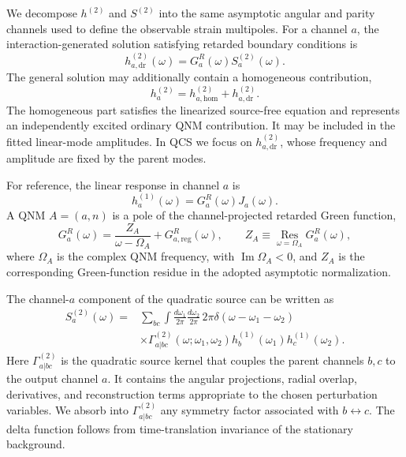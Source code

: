 \documentclass[
 reprint,
 amsmath,amssymb,
 aps,
 prl,
 superscriptaddress,
 nofootinbib
]{revtex4-2}
\begin{document}
We decompose \(h^{(2)}\) and \(S^{(2)}\) into the same asymptotic angular and parity channels used to define the observable strain multipoles. For a channel \(a\), the interaction-generated solution satisfying retarded boundary conditions is
\begin{equation}
	h_{a,\mathrm{dr}}^{(2)}(\omega)
	=
	G_a^R(\omega)S_a^{(2)}(\omega).
	\label{eq:retarded-second-order-solution}
\end{equation}
The general solution may additionally contain a homogeneous contribution,
\begin{equation}
	h_a^{(2)}
	=
	h_{a,\mathrm{hom}}^{(2)}
	+h_{a,\mathrm{dr}}^{(2)}.
\end{equation}
The homogeneous part satisfies the linearized source-free equation and represents an independently excited ordinary QNM contribution. It may be included in the fitted linear-mode amplitudes. In QCS we focus on \(h_{a,\mathrm{dr}}^{(2)}\), whose frequency and amplitude are fixed by the parent modes.

For reference, the linear response in channel \(a\) is
\begin{equation}
	h_a^{(1)}(\omega)
	=
	G_a^R(\omega)J_a(\omega).
\end{equation}
A QNM \(A=(a,n)\) is a pole of the channel-projected retarded Green function,
\begin{equation}
	G_a^R(\omega)
	=
	\frac{Z_A}{\omega-\Omega_A}
	+G_{a,\mathrm{reg}}^R(\omega),
	\qquad
	Z_A
	\equiv
	\underset{\omega=\Omega_A}{\operatorname{Res}}
	G_a^R(\omega),
	\label{eq:linear-qnm-pole}
\end{equation}
where \(\Omega_A\) is the complex QNM frequency, with
\(\operatorname{Im}\Omega_A<0\), and \(Z_A\) is the corresponding Green-function residue in the adopted asymptotic normalization.

The channel-\(a\) component of the quadratic source can be written as
\begin{align}
	S_a^{(2)}(\omega)
	={}&
	\sum_{bc}
	\int\frac{d\omega_1}{2\pi}
	\frac{d\omega_2}{2\pi}\,
	2\pi\delta(\omega-\omega_1-\omega_2)
	\nonumber\\
	&\times
	\Gamma^{(2)}_{a|bc}(\omega;\omega_1,\omega_2)
	h_b^{(1)}(\omega_1)h_c^{(1)}(\omega_2).
	\label{eq:quadratic-source-kernel}
\end{align}
Here \(\Gamma^{(2)}_{a|bc}\) is the quadratic source kernel that couples the parent channels \(b,c\) to the output channel \(a\). It contains the angular projections, radial overlap, derivatives, and reconstruction terms appropriate to the chosen perturbation variables. We absorb into \(\Gamma^{(2)}_{a|bc}\) any symmetry factor associated with \(b\leftrightarrow c\). The delta function follows from time-translation invariance of the stationary background.
\end{document}
